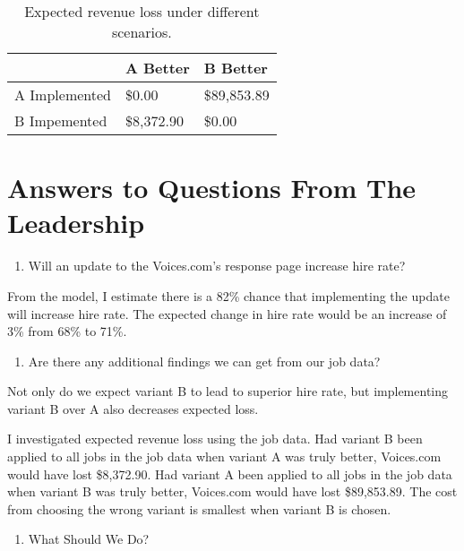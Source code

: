 \documentclass[]{article}
\providecommand{\tightlist}{%
  \setlength{\itemsep}{0pt}\setlength{\parskip}{0pt}}
\begin{document}
\begin{table}[!h]

\caption{\label{tab:unnamed-chunk-7}Expected revenue loss under different scenarios.}
\centering
\begin{tabular}[t]{lll}
\toprule
 & A Better & B Better\\
\midrule
\rowcolor{gray!6}  A Implemented & \$0.00 & \$89,853.89\\
B Impemented & \$8,372.90 & \$0.00\\
\bottomrule
\end{tabular}
\end{table}

\hypertarget{answers-to-questions-from-the-leadership}{%
\section{Answers to Questions From The
Leadership}\label{answers-to-questions-from-the-leadership}}

\begin{enumerate}
\def\labelenumi{\arabic{enumi}.}
\tightlist
\item
  Will an update to the Voices.com's response page increase hire rate?
\end{enumerate}

From the model, I estimate there is a 82\% chance that implementing the
update will increase hire rate. The expected change in hire rate would
be an increase of 3\% from 68\% to 71\%.

\begin{enumerate}
\def\labelenumi{\arabic{enumi}.}
\setcounter{enumi}{1}
\tightlist
\item
  Are there any additional findings we can get from our job data?
\end{enumerate}

Not only do we expect variant B to lead to superior hire rate, but
implementing variant B over A also decreases expected loss.

I investigated expected revenue loss using the job data. Had variant B
been applied to all jobs in the job data when variant A was truly
better, Voices.com would have lost \$8,372.90. Had variant A been
applied to all jobs in the job data when variant B was truly better,
Voices.com would have lost \$89,853.89. The cost from choosing the wrong
variant is smallest when variant B is chosen.

\begin{enumerate}
\def\labelenumi{\arabic{enumi}.}
\setcounter{enumi}{2}
\tightlist
\item
  What Should We Do?
\end{enumerate}
\end{document}
